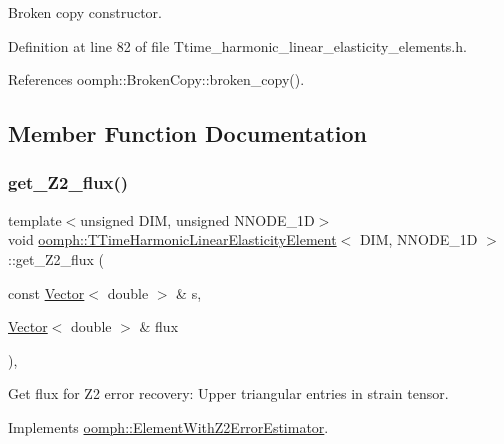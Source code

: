 Broken copy constructor. 



Definition at line 82 of file Ttime\+\_\+harmonic\+\_\+linear\+\_\+elasticity\+\_\+elements.\+h.



References oomph\+::\+Broken\+Copy\+::broken\+\_\+copy().



\subsection{Member Function Documentation}
\mbox{\label{classoomph_1_1TTimeHarmonicLinearElasticityElement_a62ff51ac6f51d39ccc8220203f679392}} 
\subsubsection{\texorpdfstring{get\+\_\+\+Z2\+\_\+flux()}{get\_Z2\_flux()}}
{\footnotesize\ttfamily template$<$unsigned D\+IM, unsigned N\+N\+O\+D\+E\+\_\+1D$>$ \\
void \hyperlink{classoomph_1_1TTimeHarmonicLinearElasticityElement}{oomph\+::\+T\+Time\+Harmonic\+Linear\+Elasticity\+Element}$<$ D\+IM, N\+N\+O\+D\+E\+\_\+1D $>$\+::get\+\_\+\+Z2\+\_\+flux (\begin{DoxyParamCaption}\item[{const \hyperlink{classoomph_1_1Vector}{Vector}$<$ double $>$ \&}]{s,  }\item[{\hyperlink{classoomph_1_1Vector}{Vector}$<$ double $>$ \&}]{flux }\end{DoxyParamCaption})\hspace{0.3cm}{\ttfamily [inline]}, {\ttfamily [virtual]}}



Get \textquotesingle{}flux\textquotesingle{} for Z2 error recovery\+: Upper triangular entries in strain tensor. 



Implements \hyperlink{classoomph_1_1ElementWithZ2ErrorEstimator_a5688ff5f546d81771cabad82ca5a7556}{oomph\+::\+Element\+With\+Z2\+Error\+Estimator}.



